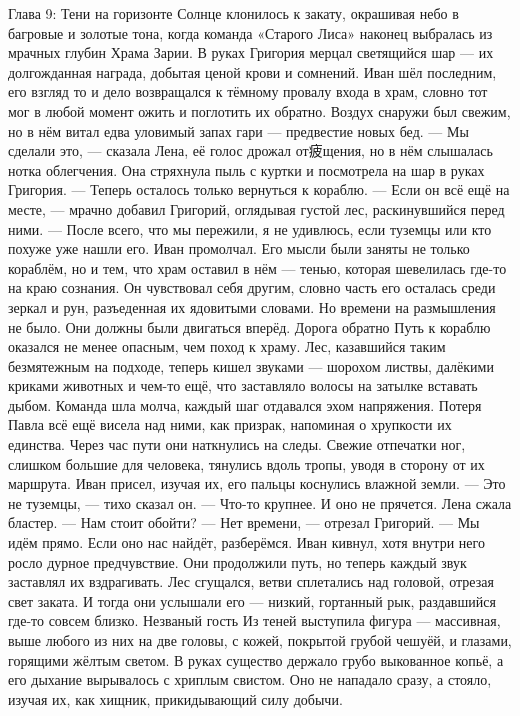 \documentclass[12pt,a4paper]{book}
\begin{document}
Глава 9: Тени на горизонте
Солнце клонилось к закату, окрашивая небо в багровые и золотые тона, когда команда «Старого Лиса» наконец выбралась из мрачных глубин Храма Зарии. В руках Григория мерцал светящийся шар — их долгожданная награда, добытая ценой крови и сомнений. Иван шёл последним, его взгляд то и дело возвращался к тёмному провалу входа в храм, словно тот мог в любой момент ожить и поглотить их обратно. Воздух снаружи был свежим, но в нём витал едва уловимый запах гари — предвестие новых бед.
— Мы сделали это, — сказала Лена, её голос дрожал от疲щения, но в нём слышалась нотка облегчения. Она стряхнула пыль с куртки и посмотрела на шар в руках Григория. — Теперь осталось только вернуться к кораблю.
— Если он всё ещё на месте, — мрачно добавил Григорий, оглядывая густой лес, раскинувшийся перед ними. — После всего, что мы пережили, я не удивлюсь, если туземцы или кто похуже уже нашли его.
Иван промолчал. Его мысли были заняты не только кораблём, но и тем, что храм оставил в нём — тенью, которая шевелилась где-то на краю сознания. Он чувствовал себя другим, словно часть его осталась среди зеркал и рун, разъеденная их ядовитыми словами. Но времени на размышления не было. Они должны были двигаться вперёд.
Дорога обратно
Путь к кораблю оказался не менее опасным, чем поход к храму. Лес, казавшийся таким безмятежным на подходе, теперь кишел звуками — шорохом листвы, далёкими криками животных и чем-то ещё, что заставляло волосы на затылке вставать дыбом. Команда шла молча, каждый шаг отдавался эхом напряжения. Потеря Павла всё ещё висела над ними, как призрак, напоминая о хрупкости их единства.
Через час пути они наткнулись на следы. Свежие отпечатки ног, слишком большие для человека, тянулись вдоль тропы, уводя в сторону от их маршрута. Иван присел, изучая их, его пальцы коснулись влажной земли.
— Это не туземцы, — тихо сказал он. — Что-то крупнее. И оно не прячется.
Лена сжала бластер. — Нам стоит обойти?
— Нет времени, — отрезал Григорий. — Мы идём прямо. Если оно нас найдёт, разберёмся.
Иван кивнул, хотя внутри него росло дурное предчувствие. Они продолжили путь, но теперь каждый звук заставлял их вздрагивать. Лес сгущался, ветви сплетались над головой, отрезая свет заката. И тогда они услышали его — низкий, гортанный рык, раздавшийся где-то совсем близко.
Незваный гость
Из теней выступила фигура — массивная, выше любого из них на две головы, с кожей, покрытой грубой чешуёй, и глазами, горящими жёлтым светом. В руках существо держало грубо выкованное копьё, а его дыхание вырывалось с хриплым свистом. Оно не нападало сразу, а стояло, изучая их, как хищник, прикидывающий силу добычи.
\end{document}
